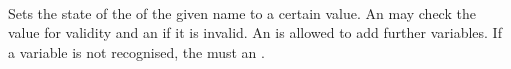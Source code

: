  \\

Sets the state of the  of the given name to a certain value. An  may check the value for validity and  an  if it is invalid.  An  is allowed to add further variables. If a variable is not recognised, the  must  an . \\




